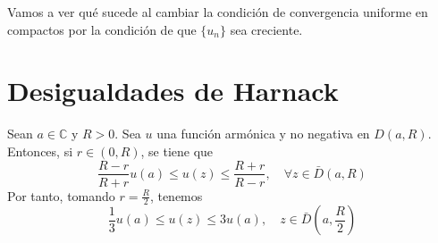Vamos a ver qué sucede al cambiar la condición de convergencia uniforme en compactos por la condición de que $\{u_n\}$ sea creciente.

\section{Desigualdades de Harnack}
Sean $a \in \mathbb{C}$ y $R > 0$.
Sea $u$ una función armónica y no negativa en $D(a, R)$.
Entonces, si $r \in (0, R)$, se tiene que
$$\frac{R-r}{R+r}u(a) \leq u(z) \leq \frac{R+r}{R-r}, \quad \forall z \in \bar{D}(a, R)$$
Por tanto, tomando $r = \frac{R}{2}$, tenemos
$$\frac{1}{3}u(a) \leq u(z) \leq 3u(a), \quad z \in \bar{D}\left(a, \frac{R}{2}\right)$$
